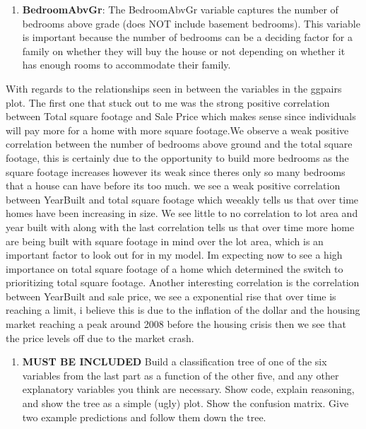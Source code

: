 \documentclass[
]{article}
\providecommand{\tightlist}{%
  \setlength{\itemsep}{0pt}\setlength{\parskip}{0pt}}
\begin{document}
\begin{enumerate}
\def\labelenumi{\arabic{enumi}.}
\setcounter{enumi}{5}
\tightlist
\item
  \textbf{BedroomAbvGr}: The BedroomAbvGr variable captures the number
  of bedrooms above grade (does NOT include basement bedrooms). This
  variable is important because the number of bedrooms can be a deciding
  factor for a family on whether they will buy the house or not
  depending on whether it has enough rooms to accommodate their family.
\end{enumerate}

With regards to the relationships seen in between the variables in the
ggpairs plot. The first one that stuck out to me was the strong positive
correlation between Total square footage and Sale Price which makes
sense since individuals will pay more for a home with more square
footage.We observe a weak positive correlation between the number of
bedrooms above ground and the total square footage, this is certainly
due to the opportunity to build more bedrooms as the square footage
increases however its weak since theres only so many bedrooms that a
house can have before its too much. we see a weak positive correlation
between YearBuilt and total square footage which weeakly tells us that
over time homes have been increasing in size. We see little to no
correlation to lot area and year built with along with the last
correlation tells us that over time more home are being built with
square footage in mind over the lot area, which is an important factor
to look out for in my model. Im expecting now to see a high importance
on total square footage of a home which determined the switch to
prioritizing total square footage. Another interesting correlation is
the correlation between YearBuilt and sale price, we see a exponential
rise that over time is reaching a limit, i believe this is due to the
inflation of the dollar and the housing market reaching a peak around
2008 before the housing crisis then we see that the price levels off due
to the market crash.

\vspace{2cm}

\newpage

\begin{enumerate}
\def\labelenumi{\arabic{enumi})}
\setcounter{enumi}{2}
\tightlist
\item
  \textbf{MUST BE INCLUDED} Build a classification tree of one of the
  six variables from the last part as a function of the other five, and
  any other explanatory variables you think are necessary. Show code,
  explain reasoning, and show the tree as a simple (ugly) plot. Show the
  confusion matrix. Give two example predictions and follow them down
  the tree.
\end{enumerate}
\end{document}
